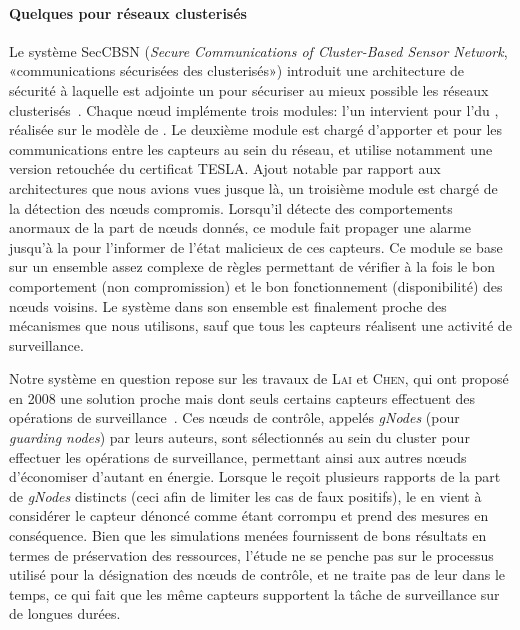 \paragraph{Quelques \IDS pour réseaux clusterisés}
Le système SecCBSN (\textit{Secure Communications of Cluster-Based Sensor Network}, «communications sécurisées des \rcs clusterisés») introduit une architecture de sécurité à laquelle est adjointe un \ids pour sécuriser au mieux possible les réseaux clusterisés~\cite{HHC07}.
Chaque nœud implémente trois modules: l'un intervient pour l'\election du \ch, réalisée sur le modèle de \leach.
Le deuxième module est chargé d'apporter  et  pour les communications entre les capteurs au sein du réseau, et utilise notamment une version retouchée du certificat TESLA.
Ajout notable par rapport aux architectures que nous avions vues jusque là, un troisième module est chargé de la détection des nœuds compromis.
Lorsqu'il détecte des comportements anormaux de la part de nœuds donnés, ce module fait propager une alarme jusqu'à la \sdb pour l'informer de l'état malicieux de ces capteurs.
Ce module se base sur un ensemble assez complexe de règles permettant de vérifier à la fois le bon comportement (non compromission) et le bon fonctionnement (disponibilité) des nœuds voisins.
Le système dans son ensemble est finalement proche des mécanismes que nous utilisons, sauf que tous les capteurs réalisent une activité de surveillance.

Notre système en question repose sur les travaux de \textsc{Lai} et \textsc{Chen}, qui ont proposé en 2008 une solution proche mais dont seuls certains capteurs effectuent des opérations de surveillance~\cite{LC08}.
Ces nœuds de contrôle, appelés \textit{gNodes} (pour \textit{guarding nodes}) par leurs auteurs, sont sélectionnés au sein du cluster pour effectuer les opérations de surveillance, permettant ainsi aux autres nœuds d'économiser d'autant en énergie.
Lorsque le \ch reçoit plusieurs rapports de la part de \textit{gNodes} distincts (ceci afin de limiter les cas de faux positifs), le \CH en vient à considérer le capteur dénoncé comme étant corrompu et prend des mesures en conséquence.
Bien que les simulations menées fournissent de bons résultats en termes de préservation des ressources, l'étude ne se penche pas sur le processus utilisé pour la désignation des nœuds de contrôle, et ne traite pas de leur  dans le temps, ce qui fait que les même capteurs supportent la tâche de surveillance sur de longues durées.

